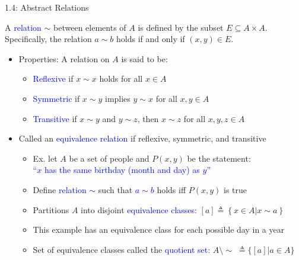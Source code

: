 \documentclass[10pt,english]{beamer}
\begin{document}
\begin{frame}{1.4: Abstract Relations}

\vspace{3mm}
\begin{definition}
A \textcolor{blue}{relation} $\sim$ between elements of $A$ is defined by the subset $E \subseteq A\times A$.  Specifically, the relation $a \sim b$ holds if and only if $(x,y)\in E$.
\end{definition}
\vspace{-5mm}

\begin{itemize}
\setlength\itemsep{3mm}
\item<1-> Properties: A relation on $A$ is said to be: \vspace{1mm}
\begin{itemize}
  \setlength\itemsep{1.5mm}
  \item \textcolor{blue}{Reflexive} if $x\sim x$ holds for all $x\in A$
  \item \textcolor{blue}{Symmetric} if $x\sim y$ implies $y\sim x$ for all $x,y\in A$
  \item \textcolor{blue}{Transitive} if $x\sim y$ and $y\sim z$, then $x\sim z$ for all $x,y,z\in A$
\end{itemize}

\item<2-> Called an \textcolor{blue}{equivalence relation} if reflexive, symmetric, and transitive \vspace{1mm}

\begin{itemize}
  \setlength\itemsep{1.5mm}
  \item Ex. let $A$ be a set of people and $P(x,y)$ be the statement: \\ \textcolor{blue}{``$x$ has the same birthday (month and day) as $y$''}
  \item Define \textcolor{blue}{relation $\sim$} such that \textcolor{blue}{$a\sim b$} holds iff $P(x,y)$ is true
  \item Partitions $A$ into disjoint \textcolor{blue}{equivalence classes}: $[a] \triangleq \left\{x\in A | x \sim a\right\}$
  \item This example has an equivalence class for each possible day in a year
  \item Set of equivalence classes called the \textcolor{blue}{quotient set}: $A \setminus \!\sim \;\triangleq \{ [a] | a\in A \}$

\end{itemize}
\end{itemize}
\end{frame}
\end{document}
